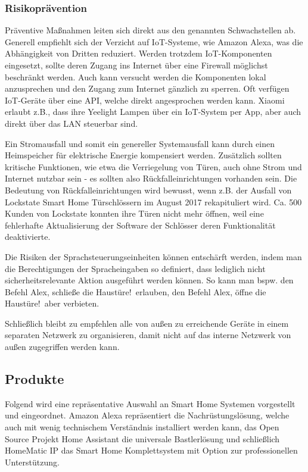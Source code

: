 \subsubsection{Risikoprävention}

Präventive Maßnahmen leiten sich direkt aus den genannten Schwachstellen ab.
Generell empfiehlt sich der Verzicht auf \ac{IoT}-Systeme, wie Amazon Alexa, was die Abhängigkeit von Dritten reduziert.
Werden trotzdem \ac{IoT}-Komponenten eingesetzt, sollte deren Zugang ins Internet über eine Firewall möglichst beschränkt werden.
Auch kann versucht werden die Komponenten lokal anzusprechen und den Zugang zum Internet gänzlich zu sperren.
Oft verfügen \ac{IoT}-Geräte über eine \ac{API}, welche direkt angesprochen werden kann.
Xiaomi erlaubt z.B., dass ihre Yeelight Lampen über ein \ac{IoT}-System per App, aber auch direkt über das \ac{LAN} steuerbar sind.

Ein Stromausfall und somit ein genereller Systemausfall kann durch einen Heimspeicher für elektrische Energie kompensiert werden.
Zusätzlich sollten kritische Funktionen, wie etwa die Verriegelung von Türen, auch ohne Strom und Internet nutzbar sein - es sollten also Rückfalleinrichtungen vorhanden sein.
Die Bedeutung von Rückfalleinrichtungen wird bewusst, wenn z.B. der Ausfall von Lockstate Smart Home Türschlössern im August 2017 rekapituliert wird.
Ca. 500 Kunden von Lockstate konnten ihre Türen nicht mehr öffnen, weil eine fehlerhafte Aktualisierung der Software der Schlösser deren Funktionalität deaktivierte.

Die Risiken der Sprachsteuerungseinheiten können entschärft werden, indem man die Berechtigungen der Spracheingaben so definiert, dass lediglich nicht sicherheitsrelevante Aktion ausgeführt werden können.
So kann man bspw. den Befehl \glqq Alex, schließe die Haustüre!\grqq \ erlauben, den Befehl \glqq Alex, öffne die Haustüre!\grqq \ aber verbieten.

Schließlich bleibt zu empfehlen alle von außen zu erreichende Geräte in einem separaten Netzwerk zu organisieren, damit nicht auf das interne Netzwerk von außen zugegriffen werden kann.

\subsection{Produkte}

Folgend wird eine repräsentative Auswahl an Smart Home Systemen vorgestellt und eingeordnet.
Amazon Alexa repräsentiert die Nachrüstungslösung, welche auch mit wenig technischem Verständnis installiert werden kann, das Open Source Projekt Home Assistant die universale Bastlerlösung und schließlich HomeMatic IP das Smart Home Komplettsystem mit Option zur professionellen Unterstützung.

